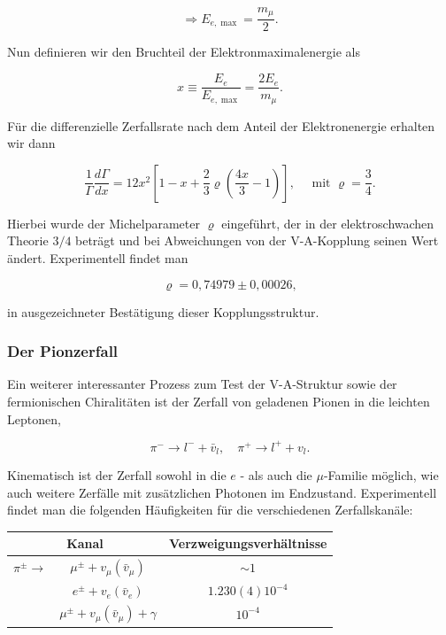 \documentclass[10pt, letterpaper]{article}
\begin{document}
$$
\Rightarrow E_{e, \max }=\frac{m_{\mu}}{2} .
$$

Nun definieren wir den Bruchteil der Elektronmaximalenergie als

$$
x \equiv \frac{E_{e}}{E_{e, \max }}=\frac{2 E_{e}}{m_{\mu}} .
$$

Für die differenzielle Zerfallsrate nach dem Anteil der Elektronenergie erhalten wir dann

$$
\frac{1}{\Gamma} \frac{d \Gamma}{d x}=12 x^{2}\left[1-x+\frac{2}{3} \varrho\left(\frac{4 x}{3}-1\right)\right], \quad \text { mit } \varrho=\frac{3}{4} .
$$

Hierbei wurde der Michelparameter $\varrho$ eingeführt, der in der elektroschwachen Theorie $3 / 4$ beträgt und bei Abweichungen von der V-A-Kopplung seinen Wert ändert. Experimentell findet man

$$
\varrho=0,74979 \pm 0,00026,
$$

in ausgezeichneter Bestätigung dieser Kopplungsstruktur.

\subsubsection*{Der Pionzerfall}
Ein weiterer interessanter Prozess zum Test der V-A-Struktur sowie der fermionischen Chiralitäten ist der Zerfall von geladenen Pionen in die leichten Leptonen,

$$
\pi^{-} \rightarrow l^{-}+\bar{v}_{l}, \quad \pi^{+} \rightarrow l^{+}+v_{l} .
$$

Kinematisch ist der Zerfall sowohl in die $e$ - als auch die $\mu$-Familie möglich, wie auch weitere Zerfälle mit zusätzlichen Photonen im Endzustand. Experimentell findet man die folgenden Häufigkeiten für die verschiedenen Zerfallskanäle:

\begin{center}
\begin{tabular}{cc|c}
\multicolumn{2}{c|}{Kanal} & Verzweigungsverhältnisse \\
\hline
$\pi^{ \pm} \rightarrow$ & $\mu^{ \pm}+v_{\mu}\left(\bar{v}_{\mu}\right)$ & $\sim 1$ \\
 & $e^{ \pm}+v_{e}\left(\bar{v}_{e}\right)$ & $1.230(4) 10^{-4}$ \\
 & $\mu^{ \pm}+v_{\mu}\left(\bar{v}_{\mu}\right)+\gamma$ & $10^{-4}$ \\
\end{tabular}
\end{center}
\end{document}
